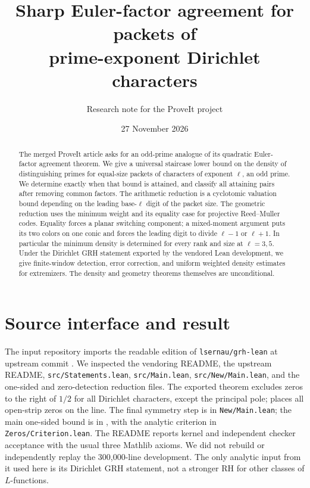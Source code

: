 \documentclass[11pt]{article}
\title{Sharp Euler-factor agreement for packets of\texorpdfstring{\\}{ }prime-exponent Dirichlet characters}
\author{Research note for the ProveIt project}
\date{27 November 2026}
\theoremstyle{remark}\newtheorem{remark}[theorem]{Remark}
\begin{document}
\maketitle
\begin{abstract}
The merged ProveIt article asks for an odd-prime analogue of its quadratic Euler-factor agreement theorem. We give a universal staircase lower bound on the density of distinguishing primes for equal-size packets of characters of exponent $\ell$, an odd prime. We determine exactly when that bound is attained, and classify all attaining pairs after removing common factors. The arithmetic reduction is a cyclotomic valuation bound depending on the leading base-$\ell$ digit of the packet size. The geometric reduction uses the minimum weight and its equality case for projective Reed--Muller codes. Equality forces a planar switching component; a mixed-moment argument puts its two colors on one conic and forces the leading digit to divide $\ell-1$ or $\ell+1$. In particular the minimum density is determined for every rank and size at $\ell=3,5$. Under the Dirichlet GRH statement exported by the vendored Lean development, we give finite-window detection, error correction, and uniform weighted density estimates for extremizers. The density and geometry theorems themselves are unconditional.
\end{abstract}

\section{Source interface and result}
The input repository \cite{vendor} imports the readable edition of \texttt{lsernau/grh-lean} at upstream commit
.
We inspected the vendoring README, the upstream README, \texttt{src/Statements.lean}, \texttt{src/Main.lean}, \texttt{src/New/Main.lean}, and the one-sided and zero-detection reduction files. The exported theorem  excludes zeros to the right of $1/2$ for all Dirichlet characters, except the principal pole;  places all open-strip zeros on the line. The final symmetry step is in \texttt{New/Main.lean}; the main one-sided bound is in , with the analytic criterion in \texttt{Zeros/Criterion.lean}. The README reports kernel and independent checker acceptance with the usual three Mathlib axioms. We did not rebuild or independently replay the 300,000-line development. The only analytic input from it used here is its Dirichlet GRH statement, not a stronger RH for other classes of $L$-functions.
\end{document}
